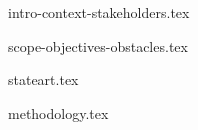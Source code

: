 {intro-context-stakeholders.tex}

\pagebreak
{scope-objectives-obstacles.tex}

\pagebreak
{stateart.tex}

\pagebreak
{methodology.tex}